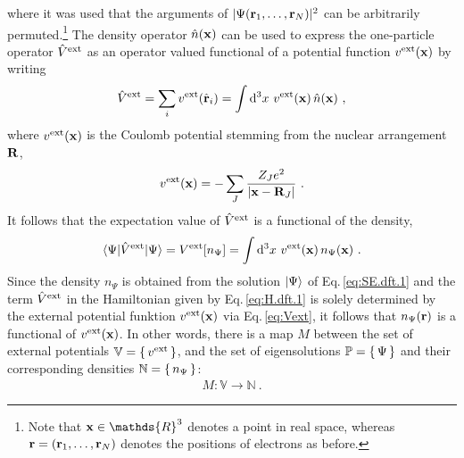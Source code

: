 where it was used that the arguments of $\lvert \Psi ({\bf r}_1, \ldots, {\bf r}_N) \rvert^2$ can be arbitrarily permuted.\footnote{Note that ${\bf x} \in \mathds{R}^3$ denotes a point in real space, whereas ${\bf r} = ({\bf r}_1, \ldots, {\bf r}_N)$ denotes the positions of electrons as before.}
The density operator $\hat n ({\bf x})$ can be used to express the one-particle operator $\hat{V}^{\rm ext}$ as an operator valued functional of a potential function $v^{\rm ext} ({\bf x})$ by writing
\begin{align}
	\hat V^{\rm ext}
		= \sum_i v^{\rm ext} (\hat{\bf r}_i)
		= \int \d^3 x ~ v^{\rm ext} ({\bf x}) \, \hat n ({\bf x})~,
		\label{eq:Vext}
\end{align}
where $v^{\rm ext} ({\bf x})$ is the Coulomb potential stemming from the nuclear arrangement $\bf R$,
\begin{align}
	v^{\rm ext} ({\bf x})
		= -\sum_{J} \frac{Z_J e^{2}}{\left|\b x - {\bf R}_{J}\right|}~.
	\label{eq:dft.v^ext}
\end{align}
It follows that the expectation value of $\hat V^{\rm ext}$ is a functional of the density,
\begin{align}
	\braket{\Psi | \hat V^{\rm ext} | \Psi}
		= V^{\rm ext} [n_\Psi]
		= \int \d^3 x ~ v^{\rm ext} ({\bf x}) \, n_\Psi ({\bf x})~.
		\label{eq:dft.Vext.expectation}
\end{align}
Since the density $n_\Psi$ is obtained from the solution $\Ket{\Psi}$ of Eq.\,\eqref{eq:SE.dft.1} and the term $\hat V^{\rm ext}$ in the Hamiltonian given by Eq.\,\eqref{eq:H.dft.1} is solely determined by the external potential funktion $v^{\rm ext} ({\bf x})$ via Eq.\,\eqref{eq:Vext}, it follows that $n_\Psi ({\bf r})$ is a functional of $v^{\rm ext} ({\bf x})$. In other words, there is a map $M$ between the set of external potentials $\mathbb V = \set{v^{\rm ext}}$, and the set of eigensolutions $\mathbb P = \set{\Psi}$ and their corresponding densities $\mathbb N = \set{n_\Psi}$:
\begin{align}
	M: \mathbb V \rightarrow \mathbb N~.
	\label{eq:dft.map.1}
\end{align}

